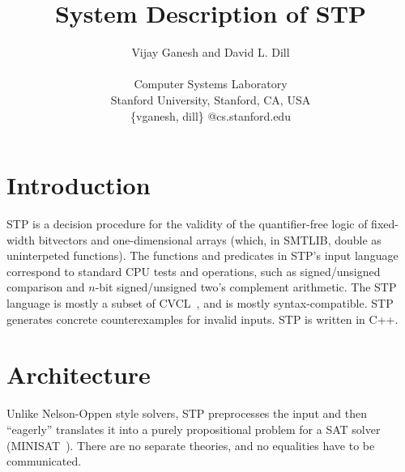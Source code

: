 \documentclass{article}
\title{System Description of STP}
\author{
Vijay Ganesh and David L. Dill \\
\\
Computer Systems Laboratory \\
Stanford University, Stanford, CA, USA \\
\{vganesh, dill\} @cs.stanford.edu}
\begin{document}
\maketitle

\newcommand{\stpread}{{\it read}}
\newcommand{\stpwrite}{{\it write}}
\newcommand{\stpite}{{\it ite}}

\section{Introduction}

STP is a decision procedure for the validity of the quantifier-free
logic of fixed-width bitvectors and one-dimensional arrays (which, in
SMTLIB, double as uninterpeted functions). The functions and
predicates in STP's input language correspond to standard CPU tests
and operations, such as signed/unsigned comparison and $n$-bit
signed/unsigned two's complement arithmetic.  The STP language is
mostly a subset of CVCL~\cite{cvcl}, and is mostly
syntax-compatible. STP generates concrete counterexamples for invalid
inputs. STP is written in C++.



\section{Architecture}

Unlike Nelson-Oppen style solvers, STP preprocesses the input and then
``eagerly'' translates it into a purely propositional problem for a
SAT solver (MINISAT~\cite{minisat}).  There are no separate theories,
and no equalities have to be communicated.
\end{document}
